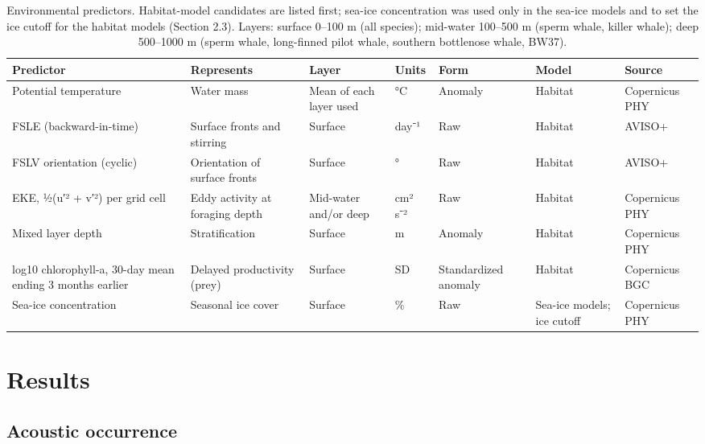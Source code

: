 \documentclass[
  11pt,
]{article}
\begin{document}
\begin{table}[!h]
\centering
\caption{\label{tab:pred}Environmental predictors. Habitat-model candidates are listed first; sea-ice concentration was used only in the sea-ice models and to set the ice cutoff for the habitat models (Section 2.3). Layers: surface 0--100 m (all species); mid-water 100--500 m (sperm whale, killer whale); deep 500--1000 m (sperm whale, long-finned pilot whale, southern bottlenose whale, BW37).}
\centering
\fontsize{8}{10}\selectfont
\begin{tabular}[t]{>{\raggedright\arraybackslash}p{3cm}>{\raggedright\arraybackslash}p{2.8cm}>{\raggedright\arraybackslash}p{2.2cm}>{\raggedright\arraybackslash}p{1.3cm}>{\raggedright\arraybackslash}p{1.8cm}>{\raggedright\arraybackslash}p{1.8cm}>{\raggedright\arraybackslash}p{1.8cm}}
\toprule
Predictor & Represents & Layer & Units & Form & Model & Source\\
\midrule
Potential temperature & Water mass & Mean of each layer used & °C & Anomaly & Habitat & Copernicus PHY\\
FSLE (backward-in-time) & Surface fronts and stirring & Surface & day⁻¹ & Raw & Habitat & AVISO+\\
FSLV orientation (cyclic) & Orientation of surface fronts & Surface & ° & Raw & Habitat & AVISO+\\
EKE, ½(u′² + v′²) per grid cell & Eddy activity at foraging depth & Mid-water and/or deep & cm² s⁻² & Raw & Habitat & Copernicus PHY\\
Mixed layer depth & Stratification & Surface & m & Anomaly & Habitat & Copernicus PHY\\
log10 chlorophyll-a, 30-day mean ending 3 months earlier & Delayed productivity (prey) & Surface & SD & Standardized anomaly & Habitat & Copernicus BGC\\
\midrule
Sea-ice concentration & Seasonal ice cover & Surface & \% & Raw & Sea-ice models; ice cutoff & Copernicus PHY\\
\bottomrule
\end{tabular}
\end{table}

\section{Results}\label{results}

\subsection{Acoustic occurrence}\label{sec-occ}
\end{document}
